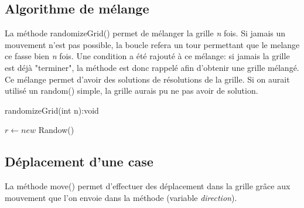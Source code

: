 		\subsection{Algorithme de mélange}
			La méthode randomizeGrid() permet de mélanger la grille \textit{n} fois. Si jamais un mouvement n'est pas possible, la boucle refera un tour permettant que le melange ce fasse bien \textit{n} fois. Une condition a été rajouté à ce mélange: si jamais la grille est déjà "terminer", la méthode est donc rappelé afin d'obtenir une grille mélangé.
			Ce mélange permet d'avoir des solutions de résolutions de la grille. Si on aurait utilisé un random() simple, la grille aurais pu ne pas avoir de solution.

			\begin{algorithm}[H]
				\caption{randomizeGrid(int n):void}
				$r\leftarrow new$ Randow()


			\end{algorithm}

		\subsection{Déplacement d'une case}
			La méthode move() permet d'effectuer des déplacement dans la grille grâce aux mouvement que l'on envoie dans la méthode (variable \textit{direction}).

